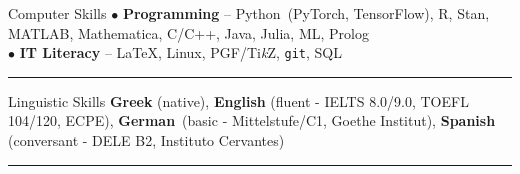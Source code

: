 \documentclass[11pt]{resume}
\begin{document}

\begin{category}{Computer Skills}
\citemnobullet
$\bullet$ \textbf{Programming} -- Python~(PyTorch, TensorFlow), R, Stan, MATLAB,  Mathematica, C/C++, Java, Julia, ML, Prolog\\
$\bullet$ \textbf{IT Literacy} -- \LaTeX, Linux, PGF/Ti\emph{k}Z, \texttt{git}, SQL 

\noindent\rule{\textwidth}{0.2pt}
\end{category}

\iffalse
\begin{category}{Experience in Data Problems}
\citemnobullet - Participation in Kaggle challenges:  Leaf Classification,
Click-Through Rate Prediction, Driver Telematics Analysis,
Sentiment Analysis on Movie Reviews,
Bike Sharing Demand

\citemnobullet - Projects on Machine Learning problems, including: Political Opinion Detection on Twitter, Automatic Recognition System for
Bimodal Detection of Guarding/Stiffness
used for Chronic Low Back Pain Rehabilitation, Prediction of Subcellular Location of Eukaryotic Proteins, Monte-Carlo Control and Temporal Difference Learning in Card Games, Anomaly Detection on Streaming Data, Models Stacking and Averaging for Predictions in Sports 

\citemnobullet - Coursework on state-of-the-art Machine Learning techniques, including: HMMs, Mixture Models, Latent Variable Models, Graphical Models, Gaussian Processes, Kernel Methods, Deep Neural Networks 

\noindent\rule{\textwidth}{0.2pt}
\end{category}
\fi


\begin{category}{Linguistic Skills}
\citemnobullet \textbf{Greek} (native),
 \textbf{English} (fluent - IELTS 8.0/9.0, TOEFL 104/120, ECPE), 
 \mbox{\textbf{German} (basic} - Mittelstufe/C1, Goethe Institut), 
 \textbf{Spanish} (conversant - DELE B2, Instituto Cervantes)
 
 \noindent\rule{\textwidth}{0.2pt}
\end{category}



\end{document}
